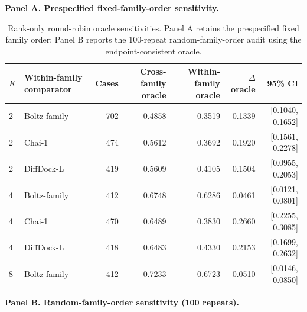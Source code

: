 \begin{table}[!ht]
\centering
\caption{Rank-only round-robin oracle sensitivities. Panel A retains the prespecified fixed family order; Panel B reports the 100-repeat random-family-order audit using the endpoint-consistent oracle.}
\label{tab:s_roundrobin}
\footnotesize
\setlength{\tabcolsep}{4pt}
\textbf{Panel A. Prespecified fixed-family-order sensitivity.}

\vspace{2pt}
\begin{tabular}{llrrrrr}
\toprule
$K$ & Within-family comparator & Cases & Cross-family oracle & Within-family oracle & $\Delta$ oracle & 95\% CI \\
\midrule
2 & Boltz-family & 702 & 0.4858 & 0.3519 & 0.1339 & [0.1040, 0.1652] \\
2 & Chai-1 & 474 & 0.5612 & 0.3692 & 0.1920 & [0.1561, 0.2278] \\
2 & DiffDock-L & 419 & 0.5609 & 0.4105 & 0.1504 & [0.0955, 0.2053] \\
4 & Boltz-family & 412 & 0.6748 & 0.6286 & 0.0461 & [0.0121, 0.0801] \\
4 & Chai-1 & 470 & 0.6489 & 0.3830 & 0.2660 & [0.2255, 0.3085] \\
4 & DiffDock-L & 418 & 0.6483 & 0.4330 & 0.2153 & [0.1699, 0.2632] \\
8 & Boltz-family & 412 & 0.7233 & 0.6723 & 0.0510 & [0.0146, 0.0850] \\
\bottomrule
\end{tabular}

\vspace{5pt}

\textbf{Panel B. Random-family-order sensitivity (100 repeats).}

\vspace{2pt}


\end{table}
